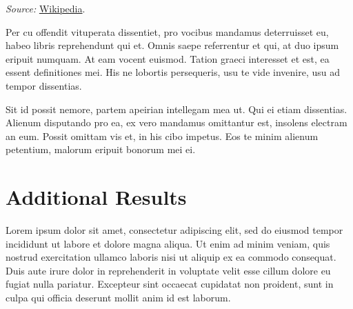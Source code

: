 \documentclass[12pt]{article}
\begin{document}
\begin{table}[tb]
\begin{threeparttable}
\begin{adjustbox}{center}
\begin{tabularx}{\textwidth}{@{}
          >{\hsize=.9\hsize}R >{\hsize}R >{\hsize}R >{\hsize=.9\hsize}R
          @{}}
        \bottomrule
      \end{tabularx}
    \end{adjustbox}

    \begin{tablenotes}\setlength{}\small
      \item \textit{Source:} \href{https://en.wikipedia.org/wiki/List_of_countries_by_population_(United_Nations)}{Wikipedia}.
    \end{tablenotes}
  \end{threeparttable}

\end{table}

Per cu offendit vituperata dissentiet, pro vocibus mandamus deterruisset eu, habeo libris reprehendunt qui et. Omnis saepe referrentur et qui, at duo ipsum eripuit numquam. At eam vocent euismod. Tation graeci interesset et est, ea essent definitiones mei. His ne lobortis persequeris, usu te vide invenire, usu ad tempor dissentias.

Sit id possit nemore, partem apeirian intellegam mea ut. Qui ei etiam dissentias. Alienum disputando pro ea, ex vero mandamus omittantur est, insolens electram an eum. Possit omittam vis et, in his cibo impetus. Eos te minim alienum petentium, malorum eripuit bonorum mei ei.


\newpage



\newpage
\appendix
{}
\renewcommand{\thefigure}{\Alph{section}\arabic{figure}}
\renewcommand{\thetable}{\Alph{section}\arabic{table}}

\section{Additional Results}

Lorem ipsum dolor sit amet, consectetur adipiscing elit, sed do eiusmod tempor incididunt ut labore et dolore magna aliqua. Ut enim ad minim veniam, quis nostrud exercitation ullamco laboris nisi ut aliquip ex ea commodo consequat. Duis aute irure dolor in reprehenderit in voluptate velit esse cillum dolore eu fugiat nulla pariatur. Excepteur sint occaecat cupidatat non proident, sunt in culpa qui officia deserunt mollit anim id est laborum.
\end{document}
